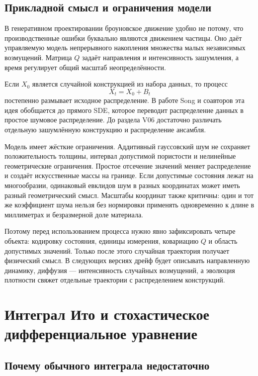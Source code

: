 \subsection{Прикладной смысл и ограничения модели}

В генеративном проектировании броуновское движение удобно не потому, что производственные ошибки буквально являются движением частицы. Оно даёт управляемую модель непрерывного накопления множества малых независимых возмущений. Матрица $Q$ задаёт направления и интенсивность зашумления, а время регулирует общий масштаб неопределённости.

Если $X_0$ является случайной конструкцией из набора данных, то процесс
\begin{equation}
\label{eq:additive-forward-diffusion-preview-v01}
X_t=X_0+B_t
\end{equation}
постепенно размывает исходное распределение. В работе Song и соавторов эта идея обобщается до прямого SDE, которое переводит распределение данных в простое шумовое распределение. До раздела V06 достаточно различать отдельную зашумлённую конструкцию и распределение ансамбля.

Модель имеет жёсткие ограничения. Аддитивный гауссовский шум не сохраняет положительность толщины, интервал допустимой пористости и нелинейные геометрические ограничения. Простое отсечение значений меняет распределение и создаёт искусственные массы на границе. Если допустимые состояния лежат на многообразии, одинаковый евклидов шум в разных координатах может иметь разный геометрический смысл. Масштабы координат также критичны: один и тот же коэффициент шума нельзя без нормировки применять одновременно к длине в миллиметрах и безразмерной доле материала.

Поэтому перед использованием процесса нужно явно зафиксировать четыре объекта: кодировку состояния, единицы измерения, ковариацию $Q$ и область допустимых значений. Только после этого случайная траектория получает физический смысл. В следующих версиях дрейф будет описывать направленную динамику, диффузия --- интенсивность случайных возмущений, а эволюция плотности свяжет отдельные траектории с распределением конструкций.

\section{Интеграл Ито и стохастическое дифференциальное уравнение}
\label{sec:ito-integral-sde}

\subsection{Почему обычного интеграла недостаточно}


